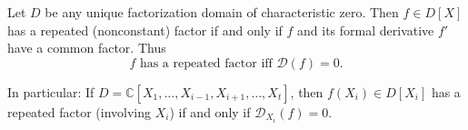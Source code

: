 Let $D$ be any unique factorization domain of characteristic zero. Then $f \in D[X]$ has a repeated (nonconstant) factor if and only if $f$ and its formal derivative $f'$ have a common factor. Thus
$$f \text{ has a repeated factor iff } \mathcal{D}(f) = 0.$$

In particular:
If $D = \mathbb{C}[X_1, \ldots, X_{i-1}, X_{i+1}, \ldots, X_t]$, then $f(X_i) \in D[X_i]$ has a repeated factor (involving $X_i$) if and only if $\mathcal{D}_{X_i}(f) = 0$.
